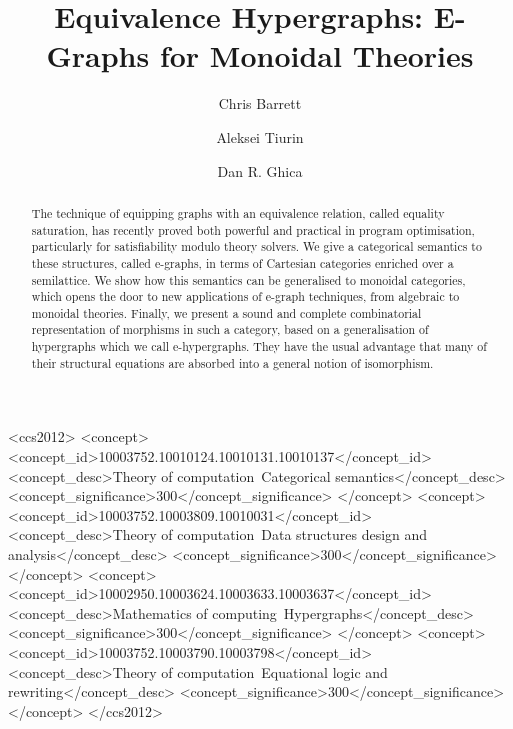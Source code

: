 \documentclass[acmsmall,screen, nonacm]{acmart}
\begin{document}
\title{Equivalence Hypergraphs: E-Graphs for Monoidal Theories}

\author{Chris Barrett}

\author{Aleksei Tiurin}

\author{Dan R. Ghica}



\begin{abstract}
The technique of equipping graphs with an equivalence relation, called equality saturation, has recently proved both powerful and practical in program optimisation, particularly for satisfiability modulo theory solvers. 
We give a categorical semantics to these structures, called e-graphs, in terms of Cartesian categories enriched over a semilattice. 
We show how this semantics can be generalised to monoidal categories, which opens the door to new applications of e-graph techniques, from algebraic to monoidal theories.
Finally, we present a sound and complete combinatorial representation of morphisms in such a category,  based on a generalisation of hypergraphs which we call e-hypergraphs.
They have the usual advantage that many of their structural equations are absorbed into a general notion of isomorphism. 
\end{abstract}


\begin{CCSXML}
<ccs2012>
   <concept>
       <concept_id>10003752.10010124.10010131.10010137</concept_id>
       <concept_desc>Theory of computation~Categorical semantics</concept_desc>
       <concept_significance>300</concept_significance>
       </concept>
   <concept>
       <concept_id>10003752.10003809.10010031</concept_id>
       <concept_desc>Theory of computation~Data structures design and analysis</concept_desc>
       <concept_significance>300</concept_significance>
       </concept>
   <concept>
       <concept_id>10002950.10003624.10003633.10003637</concept_id>
       <concept_desc>Mathematics of computing~Hypergraphs</concept_desc>
       <concept_significance>300</concept_significance>
       </concept>
   <concept>
       <concept_id>10003752.10003790.10003798</concept_id>
       <concept_desc>Theory of computation~Equational logic and rewriting</concept_desc>
       <concept_significance>300</concept_significance>
       </concept>
 </ccs2012>
\end{CCSXML}
\end{document}
